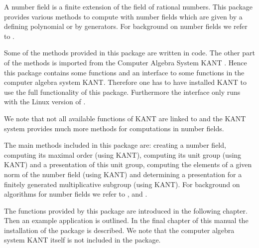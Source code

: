 

A number field is a finite extension of the field of rational numbers. 
This package provides various methods to compute with number fields
which are given by a defining polynomial or by generators. For background 
on number fields we refer to \cite{Sta79}.

Some of the methods provided in this package are written in {\GAP} code.
The other part of the methods is imported from the Computer Algebra 
System KANT \cite{Kant}. Hence this package contains some {\GAP} functions 
and an interface to some functions in the computer algebra system
KANT. Therefore one has to have installed KANT to use the full functionality
of this package. Furthermore the interface only runs with the Linux version of
{\GAP}.

We note that not all available functions of KANT are linked to {\GAP} and
the KANT system provides much more methods for computations in number
fields. 

The main methods included in this package are: creating a number field, 
computing its maximal order (using KANT), computing its unit group (using 
KANT) and a presentation of this unit group, computing the elements of a
given norm of the number field (using KANT) and determining a presentation
for a finitely generated multiplicative subgroup (using KANT). For background
on algorithms for number fields we refer to \cite{Poh93}, \cite{PZa89} and
\cite{Coh93}.

The functions provided by this package are introduced in the following
chapter. Then an example application is outlined. In the final chapter
of this manual the installation of the package is described. We note
that the computer algebra system KANT itself is not included in the package. 

